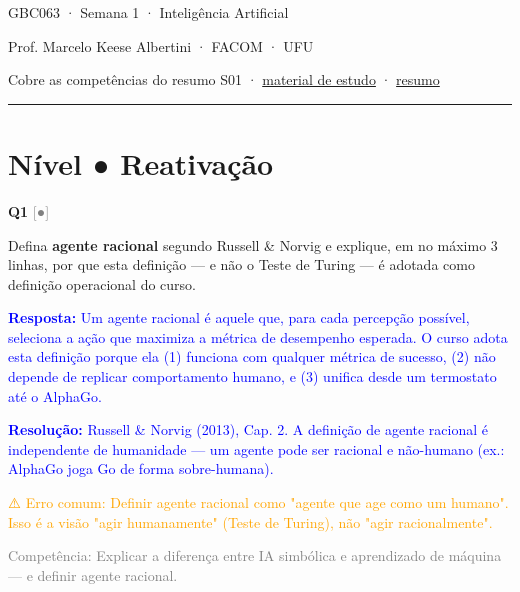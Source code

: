 \documentclass[12pt,a4paper]{article}
\newcommand{\sol}[1]{\textcolor{blue}{#1}}
\newcommand{\errocomum}[1]{\textcolor{orange}{⚠️ Erro comum: #1}}
\newcommand{\competencia}[1]{\textcolor{gray}{Competência: #1}}
\newcommand{\sol}[1]{}
\newcommand{\errocomum}[1]{}
\newcommand{\competencia}[1]{}
\newcommand{\sol}[1]{}
\newcommand{\errocomum}[1]{}
\newcommand{\competencia}[1]{}
\newcommand{\nivel}[1]{\textcolor{gray}{[#1]}}
\newenvironment{questao}[2]{
  \vspace{0.5cm}
  \noindent\textbf{Q#1} \nivel{#2} \quad
}{
  \vspace{0.2cm}
}
\begin{document}
\begin{center}
  {\sffamily\Large GBC063 · Semana 1 · Inteligência Artificial}

  \vspace{0.2cm}
  {\small Prof. Marcelo Keese Albertini · FACOM · UFU}

  \vspace{0.2cm}
  {\footnotesize Cobre as competências do resumo S01 ·
  \href{../semana01/material_introducao_ia.html}{material de estudo} ·
  \href{../semana01/resumo_s01_introducao_ia.md}{resumo}}

  \ifdefined\GABARITO
    \ifnum{}
      \vspace{0.3cm}
    \fi
  \fi
\end{center}

\vspace{0.3cm}
\hrule
\vspace{0.5cm}

\section*{Nível ● \quad Reativação}

\begin{questao}{1}{●}
  Defina \textbf{agente racional} segundo Russell \& Norvig e explique,
  em no máximo 3 linhas, por que esta definição — e não o Teste de Turing —
  é adotada como definição operacional do curso.

  \sol{
    \textbf{Resposta:} Um agente racional é aquele que, para cada percepção possível,
    seleciona a ação que maximiza a métrica de desempenho esperada. O curso adota esta
    definição porque ela (1) funciona com qualquer métrica de sucesso, (2) não depende
    de replicar comportamento humano, e (3) unifica desde um termostato até o AlphaGo.

    \textbf{Resolução:} Russell \& Norvig (2013), Cap. 2. A definição de agente racional
    é independente de humanidade — um agente pode ser racional e não-humano (ex.: AlphaGo
    joga Go de forma sobre-humana).

    \errocomum{Definir agente racional como "agente que age como um humano". Isso é a visão
    "agir humanamente" (Teste de Turing), não "agir racionalmente".}

    \competencia{Explicar a diferença entre IA simbólica e aprendizado de máquina —
    e definir agente racional.}
  }
\end{questao}
\end{document}
